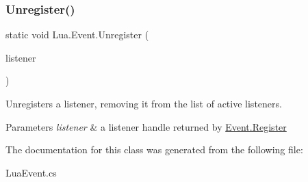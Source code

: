 \subsubsection{\texorpdfstring{Unregister()}{Unregister()}}
{\footnotesize\ttfamily static void Lua.\+Event.\+Unregister (\begin{DoxyParamCaption}\item[{Listener}]{listener }\end{DoxyParamCaption})\hspace{0.3cm}{\ttfamily [static]}}



Unregisters a listener, removing it from the list of active listeners. 


\begin{DoxyParams}{Parameters}
{\em listener} & a listener handle returned by \mbox{\hyperlink{class_lua_1_1_event_a439c6db49f39ede1ac95b7863b3a3f9a}{Event.\+Register}}\\
\hline
\end{DoxyParams}


The documentation for this class was generated from the following file\+:\begin{DoxyCompactItemize}
\item 
Lua\+Event.\+cs\end{DoxyCompactItemize}
